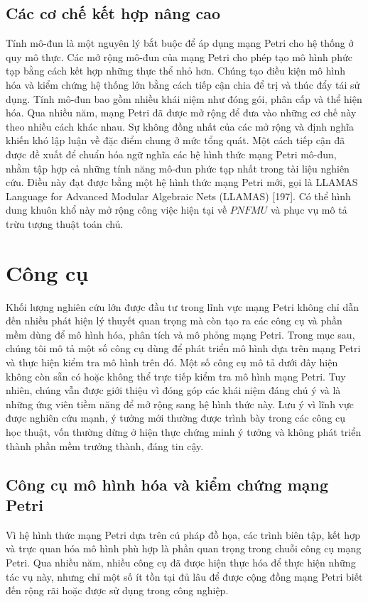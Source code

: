 
\subsection{Các cơ chế kết hợp nâng cao}
Tính mô-đun là một nguyên lý bắt buộc để áp dụng mạng Petri cho hệ thống ở quy mô thực. Các mở rộng mô-đun của mạng Petri cho phép tạo mô hình phức tạp bằng cách kết hợp những thực thể nhỏ hơn. Chúng tạo điều kiện mô hình hóa và kiểm chứng hệ thống lớn bằng cách tiếp cận chia để trị và thúc đẩy tái sử dụng. Tính mô-đun bao gồm nhiều khái niệm như đóng gói, phân cấp và thể hiện hóa. Qua nhiều năm, mạng Petri đã được mở rộng để đưa vào những cơ chế này theo nhiều cách khác nhau. Sự không đồng nhất của các mở rộng và định nghĩa khiến khó lập luận về đặc điểm chung ở mức tổng quát. Một cách tiếp cận đã được đề xuất để chuẩn hóa ngữ nghĩa các hệ hình thức mạng Petri mô-đun, nhằm tập hợp cả những tính năng mô-đun phức tạp nhất trong tài liệu nghiên cứu. Điều này đạt được bằng một hệ hình thức mạng Petri mới, gọi là LLAMAS Language for Advanced Modular Algebraic Nets (LLAMAS) [197]. Có thể hình dung khuôn khổ này mở rộng công việc hiện tại về $PNFMU$ và phục vụ mô tả trừu tượng thuật toán chủ.

\section{Công cụ}
Khối lượng nghiên cứu lớn được đầu tư trong lĩnh vực mạng Petri không chỉ dẫn đến nhiều phát hiện lý thuyết quan trọng mà còn tạo ra các công cụ và phần mềm dùng để mô hình hóa, phân tích và mô phỏng mạng Petri. Trong mục sau, chúng tôi mô tả một số công cụ dùng để phát triển mô hình dựa trên mạng Petri và thực hiện kiểm tra mô hình trên đó. Một số công cụ mô tả dưới đây hiện không còn sẵn có hoặc không thể trực tiếp kiểm tra mô hình mạng Petri. Tuy nhiên, chúng vẫn được giới thiệu vì đóng góp các khái niệm đáng chú ý và là những ứng viên tiềm năng để mở rộng sang hệ hình thức này. Lưu ý vì lĩnh vực được nghiên cứu mạnh, ý tưởng mới thường được trình bày trong các công cụ học thuật, vốn thường dừng ở hiện thực chứng minh ý tưởng và không phát triển thành phần mềm trưởng thành, đáng tin cậy.

\subsection{Công cụ mô hình hóa và kiểm chứng mạng Petri}
Vì hệ hình thức mạng Petri dựa trên cú pháp đồ họa, các trình biên tập, kết hợp và trực quan hóa mô hình phù hợp là phần quan trọng trong chuỗi công cụ mạng Petri. Qua nhiều năm, nhiều công cụ đã được hiện thực hóa để thực hiện những tác vụ này, nhưng chỉ một số ít tồn tại đủ lâu để được cộng đồng mạng Petri biết đến rộng rãi hoặc được sử dụng trong công nghiệp.

